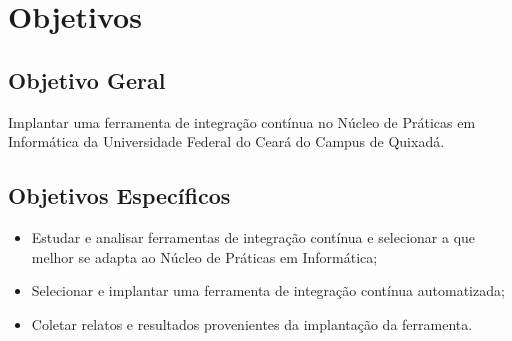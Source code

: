 \chapter{Objetivos}\label{objetivos}
\section{Objetivo Geral}\label{objetivoger}
Implantar uma ferramenta de integração contínua no Núcleo de Práticas em Informática da Universidade Federal do Ceará do Campus de Quixadá.

\section{Objetivos Específicos}

\begin{itemize}
\item Estudar e analisar ferramentas de integração contínua e selecionar a que melhor se adapta ao Núcleo de Práticas em Informática;
\item Selecionar e implantar uma ferramenta de integração contínua automatizada;
\item Coletar relatos e resultados provenientes da implantação da ferramenta.
\end{itemize}